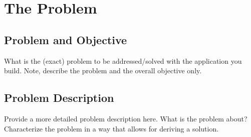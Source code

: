 \section{The Problem}

\subsection{Problem and Objective}
What is the (exact) problem to be addressed/solved with the application you build. Note, describe the problem and the overall objective only.

\subsection{Problem Description} 
Provide a more detailed problem description here. What is the problem about? Characterize the problem in a way that allows for deriving a solution.